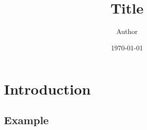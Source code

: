 \documentclass{article}
\title{Title}
\author{Author}
\date{\today}
\begin{document}
\maketitle

\tableofcontents

\section{Introduction}



\subsection{Example}


\printbibliography
\end{document}

